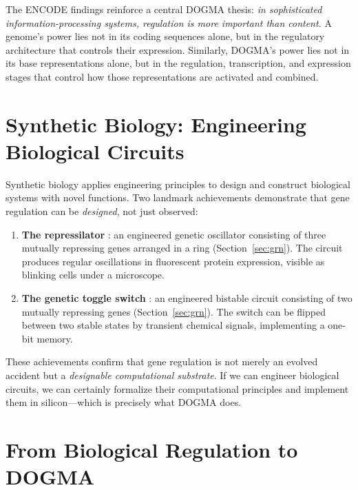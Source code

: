 The ENCODE findings reinforce a central DOGMA thesis: \emph{in sophisticated information-processing systems, regulation is more important than content.} A genome's power lies not in its coding sequences alone, but in the regulatory architecture that controls their expression. Similarly, DOGMA's power lies not in its base representations alone, but in the regulation, transcription, and expression stages that control how those representations are activated and combined.

\section{Synthetic Biology: Engineering Biological Circuits}
\label{sec:synthetic-biology}

Synthetic biology applies engineering principles to design and construct biological systems with novel functions. Two landmark achievements demonstrate that gene regulation can be \emph{designed}, not just observed:

\begin{enumerate}[leftmargin=1.8em]
  \item \textbf{The repressilator} \citep{elowitz2000}: an engineered genetic oscillator consisting of three mutually repressing genes arranged in a ring (Section~\ref{sec:grn}). The circuit produces regular oscillations in fluorescent protein expression, visible as blinking cells under a microscope.

  \item \textbf{The genetic toggle switch} \citep{gardner2000}: an engineered bistable circuit consisting of two mutually repressing genes (Section~\ref{sec:grn}). The switch can be flipped between two stable states by transient chemical signals, implementing a one-bit memory.
\end{enumerate}

These achievements confirm that gene regulation is not merely an evolved accident but a \emph{designable computational substrate}. If we can engineer biological circuits, we can certainly formalize their computational principles and implement them in silicon---which is precisely what DOGMA does.

\section{From Biological Regulation to DOGMA}
\label{sec:bio-to-dogma}

